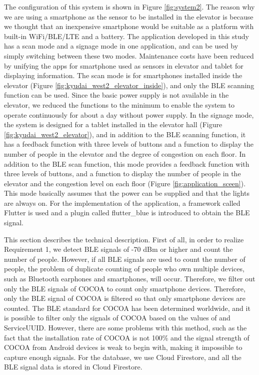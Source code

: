The configuration of this system is shown in Figure \ref{fig:system2}. The reason why we are using a smartphone as the sensor to be installed in the elevator is because we thought that an inexpensive smartphone would be suitable as a platform with built-in WiFi/BLE/LTE and a battery. The application developed in this study has a scan mode and a signage mode in one application, and can be used by simply switching between these two modes. Maintenance costs have been reduced by unifying the apps for smartphone used as sensors in elevator and tablet for displaying information. The scan mode is for smartphones installed inside the elevator (Figure \ref{fig:kyudai_west2_elevator_inside}), and only the BLE scanning function can be used. Since the basic power supply is not available in the elevator, we reduced the functions to the minimum to enable the system to operate continuously for about a day without power supply. In the signage mode, the system is designed for a tablet installed in the elevator hall (Figure \ref{fig:kyudai_west2_elevator}), and in addition to the BLE scanning function, it has a feedback function with three levels of buttons and a function to display the number of people in the elevator and the degree of congestion on each floor. In addition to the BLE scan function, this mode provides a feedback function with three levels of buttons, and a function to display the number of people in the elevator and the congestion level on each floor (Figure \ref{fig:application_sceen}). This mode basically assumes that the power can be supplied and that the lights are always on. For the implementation of the application, a framework called Flutter is used and a plugin called flutter\_blue is introduced to obtain the BLE signal.

This section describes the technical description. First of all, in order to realize Requirement 1, we detect BLE signals of -70 dBm or higher and count the number of people. However, if all BLE signals are used to count the number of people, the problem of duplicate counting of people who own multiple devices, such as Bluetooth earphones and smartphones, will occur. Therefore, we filter out only the BLE signals of COCOA to count only smartphone devices. Therefore, only the BLE signal of COCOA is filtered so that only smartphone devices are counted. The BLE standard for COCOA has been determined worldwide, and it is possible to filter only the signals of COCOA based on the values of \cite{cocoa_ble} and ServiceUUID. However, there are some problems with this method, such as the fact that the installation rate of COCOA is not 100\% and the signal strength of COCOA from Android devices is weak to begin with, making it impossible to capture enough signals. For the database, we use Cloud Firestore, and all the BLE signal data is stored in Cloud Firestore.

